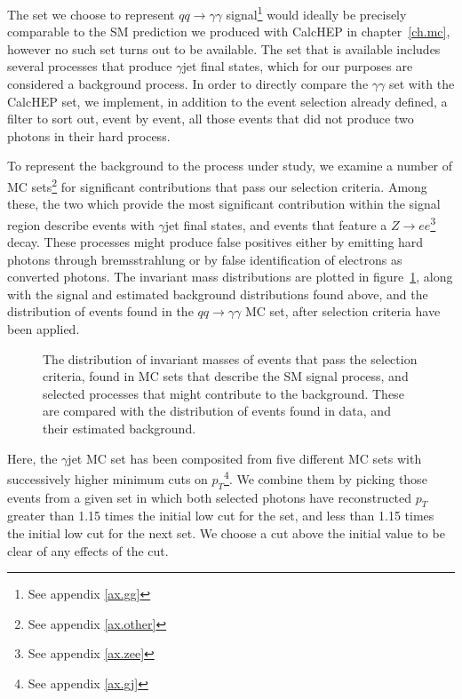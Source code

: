 The set we choose to represent $qq\rightarrow\gamma\gamma$ signal\footnote{See appendix \ref{ax.gg}} would ideally be precisely comparable to the SM prediction we produced with CalcHEP in chapter~\ref{ch.mc}, however no such set turns out to be available. The set that is available includes several processes that produce $\gamma$jet final states, which for our purposes are considered a background process. In order to directly compare the \atlas{} $\gamma\gamma$ set with the CalcHEP set, we implement, in addition to the event selection already defined, a filter to sort out, event by event, all those events that did not produce two photons in their hard process.

To represent the background to the process under study, we examine a number of MC sets\footnote{See appendix \ref{ax.other}} for significant contributions that pass our selection criteria. Among these, the two which provide the most significant contribution within the signal region describe events with $\gamma$jet final states, and events that feature a $Z\rightarrow ee$\footnote{See appendix \ref{ax.zee}} decay. These processes might produce false positives either by emitting hard photons through bremsstrahlung or by false identification of electrons as converted photons. The invariant mass distributions are plotted in figure~\ref{mclist}, along with the signal and estimated background distributions found above, and the distribution of events found in the \atlas{} $qq\rightarrow\gamma\gamma$ MC set, after selection criteria have been applied.

\begin{figure}[htp]
\begin{minipage}[b]{.69\textwidth}
\begin{infilsf} \tiny

\end{infilsf}
\end{minipage}
\begin{minipage}[b]{.3\textwidth}
\caption{The distribution of invariant masses of events that pass the selection criteria, found in \atlas{} MC sets that describe the SM signal process, and selected processes that might contribute to the background. These are compared with the distribution of events found in data, and their estimated background.}\label{mclist}
\end{minipage}
\end{figure}

Here, the $\gamma$jet MC set has been composited from five different MC sets with successively higher minimum cuts on $p_T$\footnote{See appendix \ref{ax.gj}}. We combine them by picking those events from a given set in which both selected photons have reconstructed $p_T$ greater than 1.15 times the initial low cut for the set, and less than 1.15 times the initial low cut for the next set. We choose a cut above the initial value to be clear of any effects of the cut.

